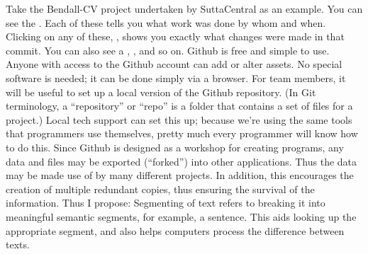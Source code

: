 {}Take the Bendall-CV project undertaken by SuttaCentral as an example. You can see the . Each of these tells you what work was done by whom and when. Clicking on any of these, , shows you exactly what changes were made in that commit. You can also see a , , and so on.\markdownRendererInterblockSeparator
{}Github is free and simple to use. Anyone with access to the Github account can add or alter assets. No special software is needed; it can be done simply via a browser. For team members, it will be useful to set up a local version of the Github repository. (In Git terminology, a “repository” or “repo” is a folder that contains a set of files for a project.) Local tech support can set this up; because we’re using the same tools that programmers use themselves, pretty much every programmer will know how to do this.\markdownRendererInterblockSeparator
{}Since Github is designed as a workshop for creating programs, any data and files may be exported (“forked”) into other applications. Thus the data may be made use of by many different projects. In addition, this encourages the creation of multiple redundant copies, thus ensuring the survival of the information.\markdownRendererInterblockSeparator
{}Thus I propose:\markdownRendererInterblockSeparator
{}\markdownRendererBlockQuoteBegin
{}
\markdownRendererBlockQuoteEnd \markdownRendererInterblockSeparator
{}\markdownRendererInterblockSeparator
{}Segmenting of text refers to breaking it into meaningful semantic segments, for example, a sentence. This aids looking up the appropriate segment, and also helps computers process the difference between texts.\markdownRendererInterblockSeparator
